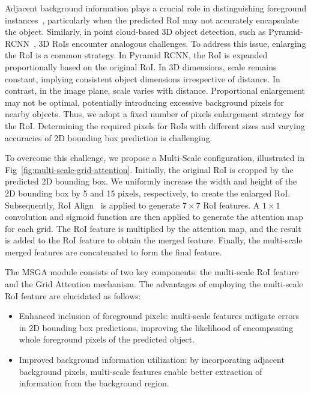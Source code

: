 \documentclass[journal]{IEEEtran}
\begin{document}
	Adjacent background information plays a crucial role in distinguishing foreground instances~\cite{pyramid-rcnn}, particularly when the predicted RoI may not accurately encapsulate the object. Similarly, in point cloud-based 3D object detection, such as Pyramid-RCNN~\cite{pyramid-rcnn}, 3D RoIs encounter analogous challenges. To address this issue, enlarging the RoI is a common strategy. In Pyramid RCNN, the RoI is expanded proportionally based on the original RoI. In 3D dimensions, scale remains constant, implying consistent object dimensions irrespective of distance. In contrast, in the image plane, scale varies with distance. Proportional enlargement may not be optimal, potentially introducing excessive background pixels for nearby objects. Thus, we adopt a fixed number of pixels enlargement strategy for the RoI. Determining the required pixels for RoIs with different sizes and varying accuracies of 2D bounding box prediction is challenging. 
	
	To overcome this challenge, we propose a Multi-Scale configuration, illustrated in Fig~\ref{fig:multi-scale-grid-attention}. Initially, the original RoI is cropped by the predicted 2D bounding box. We uniformly increase the width and height of the 2D bounding box by 5 and 15 pixels, respectively, to create the enlarged RoI. Subsequently, RoI Align~\cite{mask-rcnn} is applied to generate $7\times 7$ RoI features. A $1\times 1$ convolution and sigmoid function are then applied to generate the attention map for each grid. The RoI feature is multiplied by the attention map, and the result is added to the RoI feature to obtain the merged feature. Finally, the multi-scale merged features are concatenated to form the final feature.
	
	The MSGA module consists of two key components: the multi-scale RoI feature and the Grid Attention mechanism. The advantages of employing the multi-scale RoI feature are elucidated as follows:
	\begin{itemize}
		\item Enhanced inclusion of foreground pixels: multi-scale features mitigate errors in 2D bounding box predictions, improving the likelihood of encompassing whole foreground pixels of the predicted object.
		\item Improved background information utilization: by incorporating adjacent background pixels, multi-scale features enable better extraction of information from the background region.
	\end{itemize}
	
\end{document}
